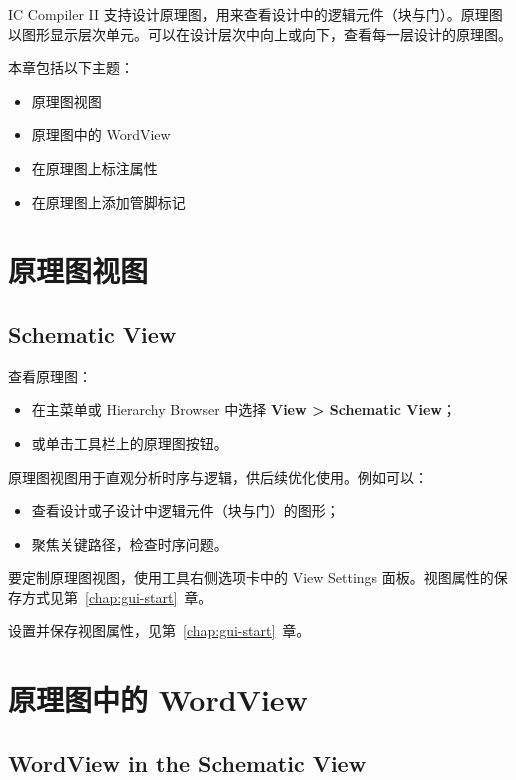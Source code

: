 \label{chap:gui-sch}

IC Compiler II 支持设计原理图，用来查看设计中的逻辑元件（块与门）。原理图以图形显示层次单元。可以在设计层次中向上或向下，查看每一层设计的原理图。

本章包括以下主题：
\begin{itemize}
  \item 原理图视图
  \item 原理图中的 WordView
  \item 在原理图上标注属性
  \item 在原理图上添加管脚标记
\end{itemize}

\section{原理图视图}
\subsection*{Schematic View}

查看原理图：
\begin{itemize}
  \item 在主菜单或 Hierarchy Browser 中选择 \textbf{View > Schematic View}；
  \item 或单击工具栏上的原理图按钮。
\end{itemize}

原理图视图用于直观分析时序与逻辑，供后续优化使用。例如可以：
\begin{itemize}
  \item 查看设计或子设计中逻辑元件（块与门）的图形；
  \item 聚焦关键路径，检查时序问题。
\end{itemize}

要定制原理图视图，使用工具右侧选项卡中的 View Settings 面板。视图属性的保存方式见第~\ref{chap:gui-start}~章。

\begin{seeAlsoBox}
设置并保存视图属性，见第~\ref{chap:gui-start}~章。
\end{seeAlsoBox}

\section{原理图中的 WordView}
\subsection*{WordView in the Schematic View}


